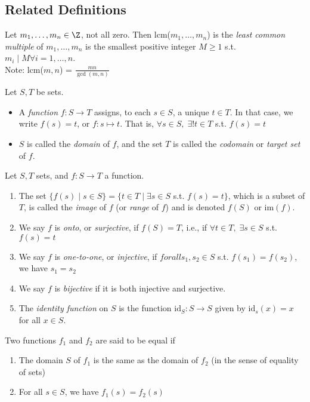 \subsection*{Related Definitions}
 Let $m_1, \ldots, m_n \in \Z$, not all zero. Then lcm($m_1, \ldots, m_n$) is the \textit{least common multiple} of $m_1, \ldots, m_n$ is the smallest positive integer $M \ge 1$ s.t. $m_i \mid M \forall i = 1, \ldots, n$.\\
Note: lcm($m,n$) = $\frac{mn}{\gcd(m,n)}$

 Let $S, T$ be sets. 
\begin{itemize}
    \item A \textit{function} $f: S \rightarrow T$ assigns, to each $s \in S$, a unique $t \in T$. In that case, we write $f(s) = t$, or $f: s\mapsto t$. That is, $\forall s \in S, \; \exists!t\in T$ s.t. $f(s) = t$
    \item $S$ is called the \textit{domain} of $f$, and the set $T$ is called the \textit{codomain} or \textit{target set} of $f$.
\end{itemize}

 Let $S, T$ sets, and $f: S \rightarrow T$ a function. 
\begin{enumerate}
    \item The set $\{f(s) \mid s \in S \} = \{t \in T \mid \exists s \in S$ s.t. $f(s) = t\}$, which is a subset of $T$, is called the \textit{image} of $f$ (or \textit{range} of $f$) and is denoted $f(S)$ or im$(f)$.
    \item We say $f$ is \textit{onto}, or \textit{surjective}, if $f(S) = T$, i.e., if $\forall t \in T, \; \exists s \in S$ s.t. $f(s) = t$
    \item We say $f$ is \textit{one-to-one}, or \textit{injective}, if $forall s_1, s_2 \in S$ s.t. $f(s_1) = f(s_2)$, we have $s_1 = s_2$
    \item We say $f$ is \textit{bijective} if it is both injective and surjective. 
    \item The \textit{identity function} on $S$ is the function $\text{id}_S : S \rightarrow S$ given by $\text{id}_s(x) = x$ for all $x \in S$.
\end{enumerate}

 Two functions $f_1$ and $f_2$ are said to be equal if 
\begin{enumerate}
    \item The domain $S$ of $f_1$ is the same as the domain of $f_2$ (in the sense of equality of sets)
    \item For all $s \in S$, we have $f_1(s) = f_2(s)$
\end{enumerate}

